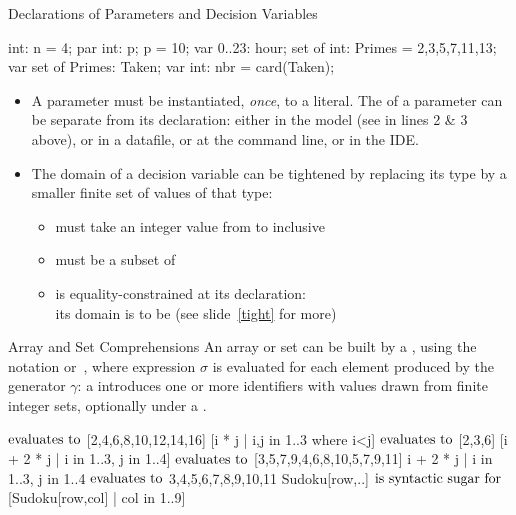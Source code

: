 \documentclass{cons-beamer}
\begin{document}
\begin{flashcardminizinc}
\begin{frame}[fragile]{Declarations of Parameters and Decision Variables}
  \footnotesize 
  \begin{mzn}
int: n = 4;
par int: p;
p = 10;
var 0..23: hour;
set of int: Primes = {2,3,5,7,11,13};
var set of Primes: Taken;
var int: nbr = card(Taken);
  \end{mzn}
  \normalsize
  \begin{itemize}
  \item A parameter must be instantiated, \emph{once}, to a literal.
    The  of a parameter can be separate from
    its declaration: either in the model (see  in lines 2
    \& 3 above), or in a datafile, or at the command line, or in the
    IDE.
  \item The domain of a decision variable can be tightened by
    replacing its type by a smaller finite set of values of that type:
    \begin{itemize}
    \item {} must take an integer value from
       to  inclusive
    \item {} must be a subset of
    \item {} is equality-constrained at its declaration: \\
      its domain is  to be  (see
      slide~\ref{tight} for more)
    \end{itemize}
  \end{itemize}
\end{frame}

\begin{frame}[fragile]{Array and Set Comprehensions}
  An array or set can be built by a , using the
  notation \mzninlinebar{[$\sigma$|$\gamma$]}
  or~\mzninlinebar{\{$\sigma$|$\gamma$\}}, where expression $\sigma$
  is evaluated for each element produced by the generator $\gamma$: a
   introduces one or more identifiers with values
  drawn from finite integer sets, optionally under a 
  .
  \begin{examples}
    \footnotesize
    \vspace{-3mm}
    \begin{mzn}
[i * 2 | i in 1..8]
    $\textnormal{evaluates to}$ [2,4,6,8,10,12,14,16]
[i * j | i,j in 1..3 where i<j]  %
    $\textnormal{evaluates to}$ [2,3,6]
[i + 2 * j | i in 1..3, j in 1..4]
    $\textnormal{evaluates to}$ [3,5,7,9,4,6,8,10,5,7,9,11]
{i + 2 * j | i in 1..3, j in 1..4}
    $\textnormal{evaluates to}$ {3,4,5,6,7,8,9,10,11}
Sudoku[row,..]  %
    $\textnormal{is syntactic sugar for}$ [Sudoku[row,col] | col in 1..9]
    \end{mzn}
  \end{examples}
\end{frame}


\end{flashcardminizinc}
\end{document}

